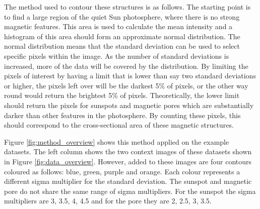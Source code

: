     The method used to contour these structures is as follows.
    The starting point is to find a large region of the quiet Sun photosphere, where there is no strong magnetic features.
    This area is used to calculate the mean intensity and a histogram of this area should form an approximate normal distribution.
    The normal distribution means that the standard deviation can be used to select specific pixels within the image.
    As the number of standard deviations is increased, more of the data will be covered by the distribution.
    By limiting the pixels of interest by having a limit that is lower than say two standard deviations or higher, the pixels left over will be the darkest 5\% of pixels, or the other way round would return the brightest 5\% of pixels.
    Theoretically, the lower limit should return the pixels for sunspots and magnetic pores which are substantially darker than other features in the photosphere.
    By counting these pixels, this should correspond to the cross-sectional area of these magnetic structures.
    
    Figure \ref{fig:method_overview} shows this method applied on the example datasets.
    The left column shows the two context images of these datasets shown in Figure \ref{fig:data_overview}.
    However, added to these images are four contours coloured as follows: blue, green, purple and orange.
    Each colour represents a different sigma multiplier for the standard deviation.
    The sunspot and magnetic pore do not share the same range of sigma multipliers.
    For the sunspot the sigma multipliers are 3, 3.5, 4, 4.5 and for the pore they are 2, 2.5, 3, 3.5.

